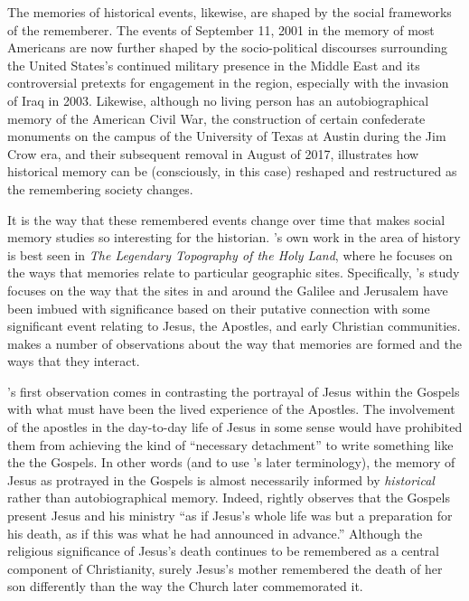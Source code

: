 The memories of historical events, likewise, are shaped by the social frameworks of the rememberer. The events of September 11, 2001 in the memory of most Americans are now further shaped by the socio-political discourses surrounding the United States's continued military presence in the Middle East and its controversial pretexts for engagement in the region, especially with the invasion of Iraq in 2003. Likewise, although no living person has an autobiographical memory of the American Civil War, the construction of certain confederate monuments on the campus of the University of Texas at Austin during the Jim Crow era, and their subsequent removal in August of 2017, illustrates how historical memory can be (consciously, in this case) reshaped and restructured as the remembering society changes.  

It is the way that these remembered events change over time that makes social memory studies so interesting for the historian. \halbwachs's own work in the area of history is best seen in \emph{The Legendary Topography of the Holy Land}, where he focuses on the ways that memories relate to particular geographic sites. Specifically, \halbwachs's study focuses on the way that the sites in and around the Galilee and Jerusalem have been imbued with significance based on their putative connection with some significant event relating to Jesus, the Apostles, and early Christian communities. \halbwachs makes a number of observations about the way that memories are formed and the ways that they interact.  

\halbwachs's first observation comes in contrasting the portrayal of Jesus within the Gospels with what must have been the lived experience of the Apostles.\autocite[193--198]{halbwachs1992} The involvement of the apostles in the day-to-day life of Jesus in some sense would have prohibited them from achieving the kind of ``necessary detachment'' to write something like the the Gospels. In other words (and to use \halbwachs's later terminology), the memory of Jesus as protrayed in the Gospels is almost necessarily informed by \emph{historical} rather than autobiographical memory.\autocite[194]{halbwachs1992} Indeed, \halbwachs rightly observes that the Gospels present Jesus and his ministry ``as if Jesus's whole life was but a preparation for his death, as if this was what he had announced in advance.''\autocite[198]{halbwachs1992} Although the religious significance of Jesus's death continues to be remembered as a central component of Christianity, surely Jesus's mother remembered the death of her son differently than the way the Church later commemorated it.\autocites[Regardless of whether \halbwachs's conception of Early Christianity would be considered sound today, the idea that the Gospels represent several collective remembrances of Jesus's life, ministry and death each bearing marks from their own \emph{Sitz im Leben} (to borrow from the form critics) seems relatively uncontroversial. A number of studies on the Jesus and early Christian memory have come about in the past several years. See][]{ledonne2009}{rodriguez2010}[For an overview of the modern impact of \halbwachs (and memory studies more generally) on the field of Historical Jesus studies, see][]{keith_ec2015}[and][]{keith_ec2015b}  

